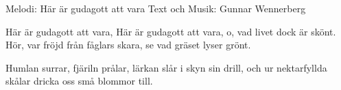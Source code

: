 \begin{song}

\begin{songmeta}
Melodi: Här är gudagott att vara
Text och Musik: Gunnar Wennerberg
\end{songmeta}

\begin{songtext}
Här är gudagott att vara,
Här är gudagott att vara,
o, vad livet dock är skönt.
Hör, var fröjd från fåglars skara,
se vad gräset lyser grönt.

Humlan surrar, fjäriln prålar,
lärkan slår i skyn sin drill,
och ur nektarfyllda skålar
dricka oss små blommor till.
\end{songtext}
\end{song}
